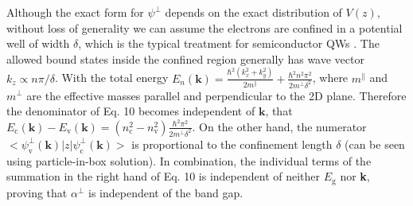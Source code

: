 \documentclass[manuscript=suppinfo,email=true,hyperref=true,keywords=false]{achemso}
\begin{document}
Although the exact form for $\psi^{\perp}$ depends on the exact
distribution of $V(z)$, without loss of generality we can assume the
electrons are confined in a potential well of width $\delta$, which is
the typical treatment for semiconductor QWs
\cite{ihn_semiconductor_2009}. The allowed bound states inside the
confined region generally has wave vector
$k_{z} \propto n \pi / \delta$. With the total energy
$E_{n}(\mathbf{k}) = {\displaystyle \frac{\hbar^{2} (k_{x}^{2} +
    k_{y}^{2})}{2 m^{\parallel}} + \frac{\hbar^{2} n^{2} \pi^{2}}{2
    m^{\perp} \delta^{2}}}$, where $m^{\parallel}$ and $m^{\perp}$ are
the effective masses parallel and perpendicular to the 2D
plane. Therefore the denominator of Eq. 10 becomes independent of
$\mathbf{k}$, that
$E_{\mathrm{c}}(\mathbf{k}) - E_{\mathrm{v}}(\mathbf{k}) =
(n_{\mathrm{c}}^{2} - n_{\mathrm{v}}^{2}) {\displaystyle
  \frac{\hbar^{2} \pi^{2}}{2 m^{\perp} \delta^{2}}}$. On the other
hand, the numerator
$<\psi^{\perp}_{\mathrm{v}}(\mathbf{k})|z|\psi^{\perp}_{\mathrm{c}}(\mathbf{k})>$
is proportional to the confinement length $\delta$ (can be seen using
particle-in-box solution\cite{davies_physics_1997}). In combination,
the individual terms of the summation in the right hand of Eq. 10 is
independent of neither $E_{\mathrm{g}}$ nor \textbf{k}, proving that
$\alpha^{\perp}$ is independent of the band gap.
\end{document}
